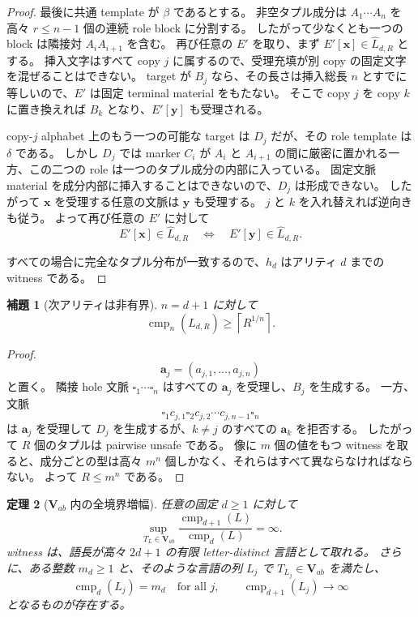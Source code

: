 \documentclass[10pt,a4paper]{ltjsarticle}
\newtheorem{theorem}{定理}[section]
\newtheorem{lemma}[theorem]{補題}
\theoremstyle{definition}
\theoremstyle{remark}
\newcommand{\cmp}{\operatorname{cmp}}
\newcommand{\blank}{\square}
\begin{document}
\begin{proof}
最後に共通 template が $\beta$ であるとする。
非空タプル成分は $A_1\cdots A_n$ を高々 $r\le n-1$ 個の連続 role block に分割する。
したがって少なくとも一つの block は隣接対 $A_iA_{i+1}$ を含む。
再び任意の $E'$ を取り、まず
$E'[\mathbf x]\in\widehat L_{d,R}$
とする。
挿入文字はすべて copy $j$ に属するので、受理充填が別 copy の固定文字を混ぜることはできない。
target が $B_j$ なら、その長さは挿入総長 $n$ とすでに等しいので、$E'$ は固定 terminal material をもたない。
そこで copy $j$ を copy $k$ に置き換えれば $B_k$ となり、$E'[\mathbf y]$ も受理される。

copy-$j$ alphabet 上のもう一つの可能な target は $D_j$ だが、その role template は $\delta$ である。
しかし $D_j$ では marker $C_i$ が $A_i$ と $A_{i+1}$ の間に厳密に置かれる一方、この二つの role は一つのタプル成分の内部に入っている。
固定文脈 material を成分内部に挿入することはできないので、$D_j$ は形成できない。
したがって $\mathbf x$ を受理する任意の文脈は $\mathbf y$ も受理する。
$j$ と $k$ を入れ替えれば逆向きも従う。
よって再び任意の $E'$ に対して
\[
E'[\mathbf x]\in\widehat L_{d,R}
\quad\Longleftrightarrow\quad
E'[\mathbf y]\in\widehat L_{d,R}.
\]

すべての場合に完全なタプル分布が一致するので、$h_d$ はアリティ $d$ までの witness である。
\end{proof}

\begin{lemma}[次アリティは非有界]
\label{vab:lem:high}
$n=d+1$ に対して
\[
\cmp_n(\widehat L_{d,R})
\ge
\left\lceil R^{1/n}\right\rceil.
\]
\end{lemma}

\begin{proof}
\[
\mathbf a_j=(a_{j,1},\ldots,a_{j,n})
\]
と置く。
隣接 hole 文脈
$\blank_1\cdots\blank_n$
はすべての $\mathbf a_j$ を受理し、$B_j$ を生成する。
一方、文脈
\[
\blank_1c_{j,1}\blank_2c_{j,2}\cdots c_{j,n-1}\blank_n
\]
は $\mathbf a_j$ を受理して $D_j$ を生成するが、$k\ne j$ のすべての $\mathbf a_k$ を拒否する。
したがって $R$ 個のタプルは pairwise unsafe である。
像に $m$ 個の値をもつ witness を取ると、成分ごとの型は高々 $m^n$ 個しかなく、それらはすべて異ならなければならない。
よって $R\le m^n$ である。
\end{proof}

\begin{theorem}[$\mathbf V_{ab}$ 内の全境界増幅]
\label{vab:thm:amplification}
任意の固定 $d\ge1$ に対して
\[
\sup_{\,T_L\in\mathbf V_{ab}}
\frac{\cmp_{d+1}(L)}{\cmp_d(L)}
=\infty.
\]
witness は、語長が高々 $2d+1$ の有限 letter-distinct 言語として取れる。
さらに、ある整数 $m_d\ge1$ と、そのような言語の列 $L_j$ で
$T_{L_j}\in\mathbf V_{ab}$ を満たし、
\[
\cmp_d(L_j)=m_d\quad\text{for all }j,
\qquad
\cmp_{d+1}(L_j)\longrightarrow\infty
\]
となるものが存在する。
\end{theorem}
\end{document}
